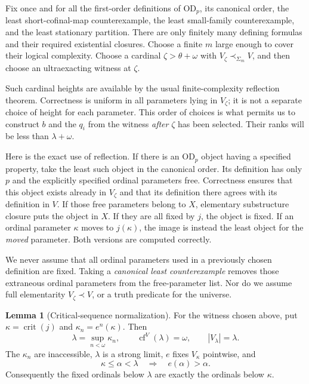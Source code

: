 \documentclass[11pt,letterpaper]{article}
\theoremstyle{definition}
\newtheorem{lemma}[definition]{Lemma}
\numberwithin{equation}{section}
\newcommand{\OD}{\mathrm{OD}}
\newcommand{\crit}{\operatorname{crit}}
\newcommand{\cf}{\operatorname{cf}}
\begin{document}
Fix once and for all the first-order definitions of $\OD_p$, its canonical order, the least short-cofinal-map counterexample, the least small-family counterexample, and the least stationary partition. There are only finitely many defining formulas and their required existential closures. Choose a finite $m$ large enough to cover their logical complexity. Choose a cardinal $\zeta>\theta+\omega$ with $V_\zeta\prec_{\Sigma_m}V$, and then choose an ultraexacting witness at $\zeta$.

Such cardinal heights are available by the usual finite-complexity reflection theorem. Correctness is uniform in all parameters lying in $V_\zeta$; it is not a separate choice of height for each parameter. This order of choices is what permits us to construct $b$ and the $q_i$ from the witness \emph{after} $\zeta$ has been selected. Their ranks will be less than $\lambda+\omega$.

Here is the exact use of reflection. If there is an $\OD_p$ object having a specified property, take the least such object in the canonical order. Its definition has only $p$ and the explicitly specified ordinal parameters free. Correctness ensures that this object exists already in $V_\zeta$ and that its definition there agrees with its definition in $V$. If those free parameters belong to $X$, elementary substructure closure puts the object in $X$. If they are all fixed by $j$, the object is fixed. If an ordinal parameter $\kappa$ moves to $j(\kappa)$, the image is instead the least object for the \emph{moved} parameter. Both versions are computed correctly.

We never assume that all ordinal parameters used in a previously chosen definition are fixed. Taking a \emph{canonical least counterexample} removes those extraneous ordinal parameters from the free-parameter list. Nor do we assume full elementarity $V_\zeta\prec V$, or a truth predicate for the universe.

\begin{lemma}[Critical-sequence normalization]\label{lem:critical}
For the witness chosen above, put $\kappa=\crit(j)$ and $\kappa_n=e^n(\kappa)$. Then
\[
\lambda=\sup_{n<\omega}\kappa_n,
\qquad
\cf^V(\lambda)=\omega,
\qquad
|V_\lambda|=\lambda.
\]
The $\kappa_n$ are inaccessible, $\lambda$ is a strong limit, $e$ fixes $V_\kappa$ pointwise, and
\begin{equation}\label{eq:motion}
\kappa\leq\alpha<\lambda\quad\Longrightarrow\quad e(\alpha)>\alpha.
\end{equation}
Consequently the fixed ordinals below $\lambda$ are exactly the ordinals below $\kappa$.
\end{lemma}
\end{document}
